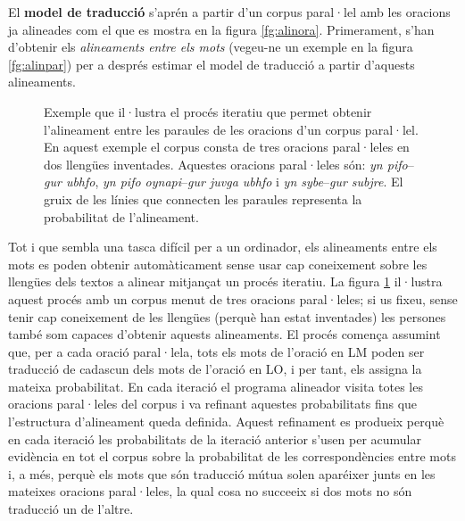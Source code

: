 El \textbf{model de traducció} s'aprén a partir d'un corpus paral·lel
amb les oracions ja alineades com el que es mostra en la figura
\ref{fg:alinora}. Primerament, s'han d'obtenir els \emph{alineaments
  entre els mots} (vegeu-ne un exemple en la figura \ref{fg:alinpar})
per a després estimar el model de traducció a partir d'aquests
alineaments.

\begin{figure}[tb]
  \centering %



  \caption{Exemple que il·lustra el procés iteratiu que permet obtenir
    l'alineament entre les paraules de les oracions d'un corpus
    paral·lel. En aquest exemple el corpus consta de tres oracions
    paral·leles en dos llengües inventades. Aquestes oracions
    paral·leles són: \emph{yn pifo}--\emph{gur ubhfo}, \emph{yn pifo
      oynapi}--\emph{gur juvga ubhfo} i \emph{yn sybe}--\emph{gur
      subjre}. El gruix de les línies que connecten les paraules
    representa la probabilitat de l'alineament.}
\label{fg:pasosalin}
\end{figure}

Tot i que sembla una tasca difícil per a un ordinador, els alineaments
entre els mots es poden obtenir automàticament sense usar cap
coneixement sobre les llengües dels textos a alinear mitjançat un
procés iteratiu. La figura \ref{fg:pasosalin} il·lustra aquest procés
amb un corpus menut de tres oracions paral·leles; si us fixeu, sense
tenir cap coneixement de les llengües (perquè han estat inventades)
les persones també som capaces d'obtenir aquests alineaments. El
procés comença assumint que, per a cada oració paral·lela, tots els
mots de l'oració en LM poden ser traducció de cadascun dels mots de
l'oració en LO, i per tant, els assigna la mateixa probabilitat.  En
cada iteració el programa alineador visita totes les oracions
paral·leles del corpus i va refinant aquestes probabilitats fins que
l'estructura d'alineament queda definida. Aquest refinament es
produeix perquè en cada iteració les probabilitats de la iteració
anterior s'usen per acumular evidència en tot el corpus sobre la
probabilitat de les correspondències entre mots i, a més, perquè els
mots que són traducció mútua solen aparéixer junts en les mateixes
oracions paral·leles, la qual cosa no succeeix si dos mots no són
traducció un de l'altre.

